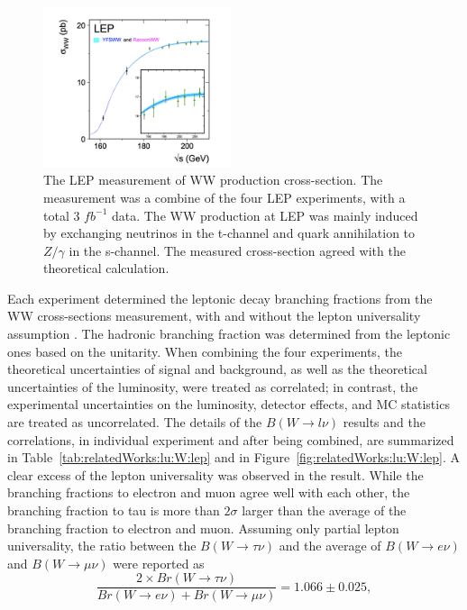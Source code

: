 \begin{figure}[ht]
    \centering
    \includegraphics[width=0.49\textwidth]{chapters/RelatedWorks/sectionLU/figures/lep_ww.png}
    \caption{The LEP measurement of WW production cross-section. The measurement was a combine of the four LEP experiments, with a total 3 $fb^{-1}$  data. The WW production at LEP was mainly induced by exchanging neutrinos in the t-channel and quark annihilation to $Z/\gamma$  in the s-channel. The measured cross-section agreed with the theoretical calculation.}
    \label{fig:relatedWorks:lu:W:lepWWxs}
\end{figure}

Each experiment determined the leptonic \PW decay branching fractions from the WW cross-sections measurement, with and without the lepton universality assumption \cite{Schael:2013ita}. The hadronic branching fraction was determined from the leptonic ones based on the unitarity. When combining the four experiments, the theoretical uncertainties of signal and background, as well as the theoretical uncertainties of the luminosity, were treated as correlated; in contrast, the experimental uncertainties on the luminosity, detector effects, and MC statistics are treated as uncorrelated. The details of the $B(W\to l \nu)$ results and the correlations, in individual experiment and after being combined, are summarized in Table~\ref{tab:relatedWorks:lu:W:lep} and in Figure~\ref{fig:relatedWorks:lu:W:lep}. A clear excess of the lepton universality was observed in the result. While the branching fractions to electron and muon agree well with each other, the branching fraction to tau is more than $2 \sigma$ larger than the average of the branching fraction to electron and muon. Assuming only partial lepton universality, the ratio between the $B(W\to \tau \nu)$ and the average of $B(W\to e \nu)$ and $B(W\to \mu \nu)$ were reported as \cite{Schael:2013ita}
\begin{equation*}
    \frac{2\times Br(W\to \tau \nu)}{Br(W\to e \nu)+ Br(W\to \mu  \nu)} = 1.066 \pm 0.025,
\end{equation*}


